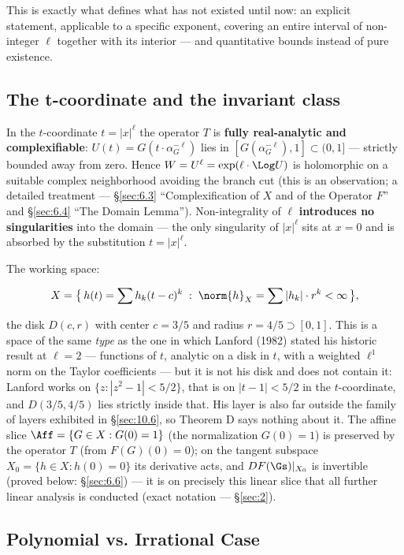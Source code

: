 This is exactly what defines what has not existed until now: an explicit
statement, applicable to a specific exponent, covering an entire interval of
non-integer $\ell$ together with its interior --- and quantitative bounds instead
of pure existence.


\subsection{The t-coordinate and the invariant class}
\label{sec:1.1}

In the $t$-coordinate $t=|x|^\ell$ the operator $T$ is \textbf{fully real-analytic and
complexifiable}: $U(t) = G(t\cdot\alpha_G^{-\ell})$ lies in $[G(\alpha_G^{-\ell}), 1] \subset (0, 1]$ --- strictly
bounded away from zero. Hence $W = U^{\ell} = \exp(\ell \cdot \Log U)$ is holomorphic on a suitable
complex neighborhood avoiding the branch cut (this is an observation; a detailed
treatment --- \S\ref{sec:6.3} ``Complexification of $X$ and of the Operator $F$'' and \S\ref{sec:6.4} ``The Domain
Lemma''). Non-integrality of $\ell$ \textbf{introduces no singularities} into the domain --- the
only singularity of $|x|^\ell$ sits at $x=0$ and is absorbed by the substitution $t=|x|^\ell$.

The working space:

\[
X = \bigl\{\, h(t) = \sum h_k (t-c)^k \; : \; \norm{h}_X = \sum |h_k| \cdot r^k < \infty \,\bigr\},
\]

the disk $D(c,r)$ with center $c=3/5$ and radius $r=4/5 \supset [0,1]$.
This is a space of the same \emph{type} as the one in which Lanford (1982)
\cite{lanford1982computer} stated his historic result at $\ell=2$ --- functions of $t$,
analytic on a disk in $t$, with a weighted $\ell^{1}$ norm on the Taylor coefficients ---
but it is not his disk and does not contain it: Lanford works on $\{z : |z^{2}-1| < 5/2\}$,
that is on $|t-1| < 5/2$ in the $t$-coordinate, and $D(3/5, 4/5)$ lies strictly inside that.
His layer is also far outside the family of layers exhibited in \S\ref{sec:10.6}, so
Theorem D says nothing about it. The
affine slice $\Aff = \{G \in X : G(0) = 1\}$ (the normalization $G(0)=1$) is preserved by the
operator $T$ (from $F(G)(0) = 0$); on the tangent subspace $X_{0} = \{h \in X : h(0) = 0\}$ its
derivative acts, and $DF(\Gs)|_{X_{0}}$ is invertible (proved below: \S\ref{sec:6.6}) --- it is on
precisely this linear slice that all further linear analysis is conducted (exact
notation --- \S\ref{sec:2}).


\subsection{Polynomial vs. Irrational Case}
\label{sec:1.2}

